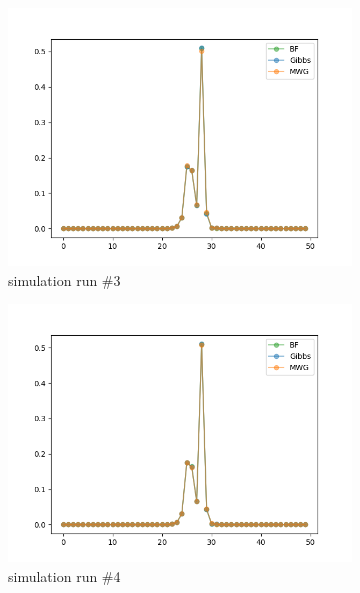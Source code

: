 \begin{figure}[H]
\begin{subfigure}{.3\textwidth}
	    \centering
    	\includegraphics[width=\linewidth]{../../plots/Posterior_post_burnin_M2_N50_NMCMC1_seed2_diffind2.png}
    	\caption{simulation run \#3}
	\end{subfigure}
	\begin{subfigure}{.3\textwidth}
	    \centering
    	\includegraphics[width=\linewidth]{../../plots/Posterior_post_burnin_M2_N50_NMCMC1_seed3_diffind2.png}
    	\caption{simulation run \#4}
	\end{subfigure}
	\begin{subfigure}{.3\textwidth}
	    \centering

\end{subfigure}
\end{figure}
